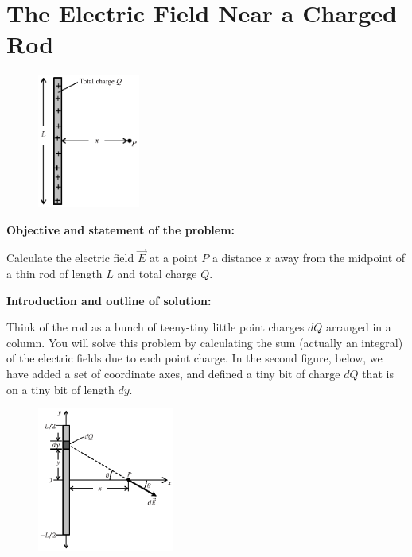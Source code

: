 \section{The Electric Field Near a Charged Rod}


\makelabheader %

\begin{figure}
\vspace{-.25in}
    \includegraphics[width=0.3\textwidth]{electric_field_near_a_charged_rod/fig1.eps}
\end{figure}

\vspace{1cm}

\textbf{Objective and statement of the problem:}

Calculate the electric field $\vec{E}$ at a point $P$ a distance $x$ away from the midpoint of a thin rod
of length $L$ and total charge $Q$.

\vspace{1cm}

\textbf{Introduction and outline of solution:}

Think of the rod as a bunch of teeny-tiny little point charges $dQ$ arranged in a column. You will solve this problem by calculating the sum (actually an integral) of the electric fields due to each point charge.  In the second figure, below, we have added a set of coordinate axes, and defined a tiny bit of charge $dQ$ that is on a tiny bit of length $dy$.  
\par

\begin{figure}
\vspace{-.65in}
   \includegraphics[width=0.4\textwidth]{electric_field_near_a_charged_rod/fig2.eps}
\end{figure}

